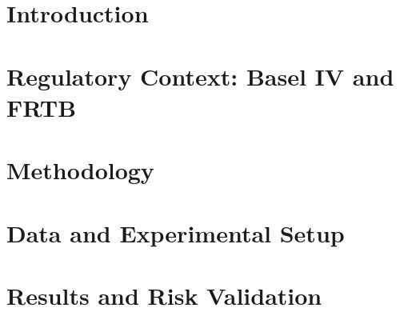 \documentclass[12pt, a4paper]{article}
\begin{document}
\section{Introduction}


\section{Regulatory Context: Basel IV and FRTB}


\section{Methodology}


\section{Data and Experimental Setup}


\section{Results and Risk Validation}

\end{document}
